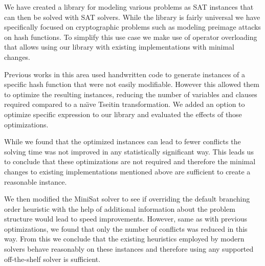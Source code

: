 We have created a library for modeling various problems as SAT instances that can then be solved with SAT solvers.
While the library is fairly universal we have specifically focused on cryptographic problems such as modeling preimage attacks on hash functions.
To simplify this use case we make use of operator overloading that allows using our library with existing implementations with minimal changes.

Previous works in this area used handwritten code to generate instances of a specific hash function that were not easily modifiable.
However this allowed them to optimize the resulting instances, reducing the number of variables and clauses required compared to a na\"{\i}ve Tseitin transformation.
We added an option to optimize specific expression to our library and evaluated the effects of those optimizations.

While we found that the optimized instances can lead to fewer conflicts the solving time was not improved in any statistically significant way.
This leads us to conclude that these optimizations are not required and therefore the minimal changes to existing implementations mentioned above are sufficient to create a reasonable instance.

We then modified the MiniSat solver to see if overriding the default branching order heuristic with the help of additional information about the problem structure would lead to speed improvements.
However, same as with previous optimizations, we found that only the number of conflicts was reduced in this way.
From this we conclude that the existing heuristics employed by modern solvers behave reasonably on these instances and therefore using any supported off-the-shelf solver is sufficient.